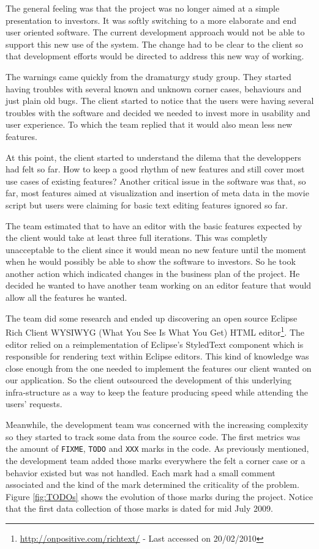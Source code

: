 \documentclass[lnbip]{svmultln}
\begin{document}
The general feeling was that the project was no longer aimed at a
simple presentation to investors. It was softly switching to a more
elaborate and end user oriented software. The current development
approach would not be able to support this new use of the system. The
change had to be clear to the client so that development efforts would
be directed to address this new way of working.

The warnings came quickly from the dramaturgy study group. They
started having troubles with several known and unknown corner cases,
behaviours and just plain old bugs. The client started to notice that
the users were having several troubles with the software and decided
we needed to invest more in usability and user experience. To which
the team replied that it would also mean less new features.

At this point, the client started to understand the dilema that the
developpers had felt so far. How to keep a good rhythm of new features
and still cover most use cases of existing features? Another critical
issue in the software was that, so far, most features aimed at
visualization and insertion of meta data in the movie script but users
were claiming for basic text editing features ignored so far.

The team estimated that to have an editor with the basic features
expected by the client would take at least three full iterations. This
was completly unacceptable to the client since it would mean no new
feature until the moment when he would possibly be able to show the
software to investors. So he took another action which indicated
changes in the business plan of the project. He decided he wanted to
have another team working on an editor feature that would allow all
the features he wanted.

The team did some research and ended up discovering an open source
Eclipse Rich Client WYSIWYG (What You See Is What You Get) HTML
editor\footnote{\url{http://onpositive.com/richtext/} - Last accessed on
20/02/2010}. The editor relied on a reimplementation of Eclipse's
StyledText component which is responsible for rendering text within
Eclipse editors. This kind of knowledge was close enough from the one
needed to implement the features our client wanted on our
application. So the client outsourced the development of this
underlying infra-structure as a way to keep the feature producing
speed while attending the users' requests.

Meanwhile, the development team was concerned with the increasing
complexity so they started to track some data from the source
code. The first metrics was the amount of \texttt{FIXME},
\texttt{TODO} and \texttt{XXX} marks in the code. As previously
mentioned, the development team added those marks everywhere the felt
a corner case or a behavior existed but was not handled. Each mark had
a small comment associated and the kind of the mark determined the
criticality of the problem. Figure \ref{fig:TODOs} shows the evolution
of those marks during the project. Notice that the first data
collection of those marks is dated for mid July 2009.
\end{document}
